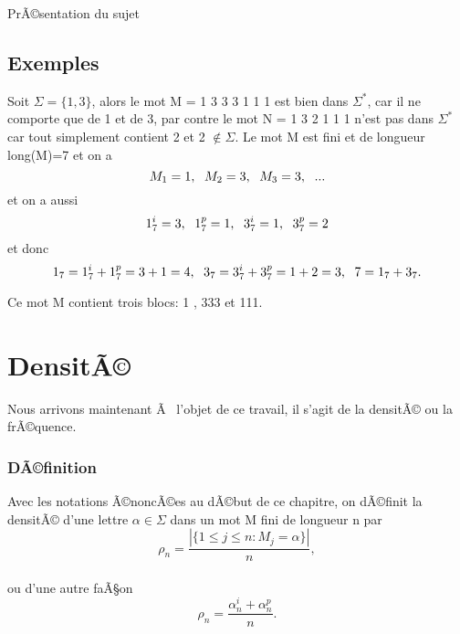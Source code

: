 \documentclass[12pt,a4paper,oneside]{book}
\begin{document}
\begin{titlepage}
\begin{chapter}{PrÃ©sentation du sujet}
 \subsection{Exemples}
\par Soit $\Sigma = \{1,3\}$, alors le mot M = 1 3 3 3 1 1 1 est bien dans $\Sigma^*$, car il ne comporte que de 1 et de 3, par contre le mot N = 1 3 2 1 1 1 n'est pas dans $\Sigma^*$ car tout simplement contient 2 et 2 $\notin \Sigma$. Le mot M est fini et de longueur long(M)=7 et on a $$M_1 = 1,\hspace{0,5\baselineskip}  M_2 = 3,\hspace{0,5\baselineskip} M_3 = 3,\hspace{0,5\baselineskip} ... $$ et on a aussi \\
 \[ 1_7^i=3 , \hspace{0,5\baselineskip}1_7^p=1 , \hspace{0,5\baselineskip} 3_7^i=1 ,\hspace{0,5\baselineskip}  3_7^p=2 \] 
 et donc
\[ 1_7 = 1_7^i + 1_7^p =3+1=4 , \hspace{0,5\baselineskip} 3_7=3_7^i+3_7^p=1+2=3,\hspace{0,5\baselineskip}   7=1_7+3_7 .\]
\par Ce mot M contient trois blocs: \hspace{0,5\baselineskip} 1 \hspace{0,5\baselineskip} , \hspace{0,5\baselineskip} 333 \hspace{0,5\baselineskip} et\hspace{0,5\baselineskip} 111.
\section{DensitÃ©}
\par Nous arrivons maintenant Ã  l'objet de ce travail, il s'agit de la densitÃ© ou la frÃ©quence.
\subsubsection{DÃ©finition}
\par Avec les notations Ã©noncÃ©es au dÃ©but de ce chapitre, on dÃ©finit la densitÃ© d'une lettre $\alpha \in \Sigma$ dans un mot M fini de longueur n par \[ \rho_n = \frac{|\{ 1 \leq j \leq n : M_j =\alpha \} |}{n} ,\]   \\ 
ou d'une autre faÃ§on \[ \rho_n = \frac{\alpha_n^i+\alpha_n^p}{n} .\]   \\

\end{chapter}
\end{titlepage}
\end{document}
